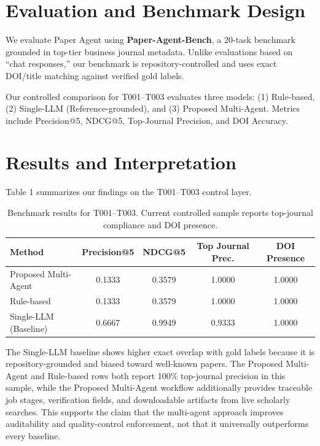 \documentclass[10pt,twocolumn]{article}
\begin{document}
\section{Evaluation and Benchmark Design}

We evaluate Paper Agent using \textbf{Paper-Agent-Bench}, a 20-task benchmark grounded in top-tier business journal metadata. Unlike evaluations based on ``chat responses,'' our benchmark is repository-controlled and uses exact DOI/title matching against verified gold labels.

Our controlled comparison for T001--T003 evaluates three models: (1) Rule-based, (2) Single-LLM (Reference-grounded), and (3) Proposed Multi-Agent. Metrics include Precision@5, NDCG@5, Top-Journal Precision, and DOI Accuracy.

\section{Results and Interpretation}

Table 1 summarizes our findings on the T001--T003 control layer.

\begin{table}[t]
\centering
\begin{tabular}{lcccc}
\toprule
Method & Precision@5 & NDCG@5 & Top Journal Prec. & DOI Presence \\
\midrule
Proposed Multi-Agent & 0.1333 & 0.3579 & 1.0000 & 1.0000 \\
Rule-based & 0.1333 & 0.3579 & 1.0000 & 1.0000 \\
Single-LLM (Baseline) & 0.6667 & 0.9949 & 0.9333 & 1.0000 \\
\bottomrule
\end{tabular}
\caption{Benchmark results for T001--T003. Current controlled sample reports top-journal compliance and DOI presence.}
\end{table}

The Single-LLM baseline shows higher exact overlap with gold labels because it is repository-grounded and biased toward well-known papers. The Proposed Multi-Agent and Rule-based rows both report 100\% top-journal precision in this sample, while the Proposed Multi-Agent workflow additionally provides traceable job stages, verification fields, and downloadable artifacts from live scholarly searches. This supports the claim that the multi-agent approach improves auditability and quality-control enforcement, not that it universally outperforms every baseline.
\end{document}
